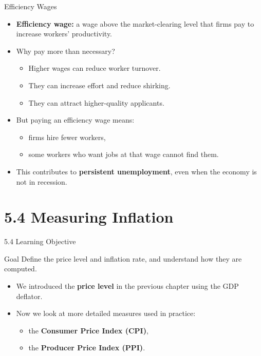 \documentclass[aspectratio=169]{beamer}
\begin{document}
\begin{frame}{Efficiency Wages}
\transfade
\begin{itemize}[<+->]
  \item \textbf{Efficiency wage:} a wage above the market-clearing level that firms pay to increase workers’ productivity.
  \item Why pay more than necessary?
  \begin{itemize}[<+->]
    \item Higher wages can reduce worker turnover.
    \item They can increase effort and reduce shirking.
    \item They can attract higher-quality applicants.
  \end{itemize}
  \item But paying an efficiency wage means:
  \begin{itemize}[<+->]
    \item firms hire fewer workers,
    \item some workers who want jobs at that wage cannot find them.
  \end{itemize}
  \item This contributes to \textbf{persistent unemployment}, even when the economy is not in recession.
\end{itemize}
\end{frame}

\section{5.4 Measuring Inflation}

\begin{frame}{5.4 Learning Objective}
\transfade
\begin{block}{Goal}
Define the price level and inflation rate, and understand how they are computed.
\end{block}
\begin{itemize}[<+->]
  \item We introduced the \textbf{price level} in the previous chapter using the GDP deflator.
  \item Now we look at more detailed measures used in practice:
  \begin{itemize}[<+->]
    \item the \textbf{Consumer Price Index (CPI)},
    \item the \textbf{Producer Price Index (PPI)}.
  \end{itemize}
\end{itemize}
\end{frame}
\end{document}
